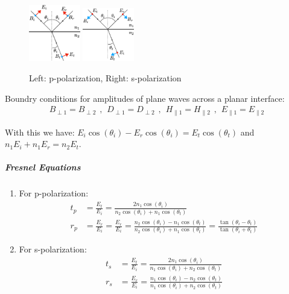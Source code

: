 \begin{figure}[h]
    \centering
    \includegraphics[width=0.2\textwidth]{Figures/p-polarization.png}
    \includegraphics[width=0.2\textwidth]{Figures/s-polarization.png}
    \caption{Left: p-polarization, Right: s-polarization}
\end{figure}

Boundry conditions for amplitudes of plane waves across a planar interface:
\begin{align*}
    B_{\perp 1} = B_{\perp 2}
    \hspace{5pt} , \hspace{5pt}
    D_{\perp 1} = D_{\perp 2}
    \hspace{5pt} , \hspace{5pt}
    H_{\parallel 1} = H_{\parallel 2}
    \hspace{5pt} , \hspace{5pt}
    E_{\parallel 1} = E_{\parallel 2}
\end{align*}

With this we have: $E_i \cos(\theta_i) - E_r \cos(\theta_i) = E_t \cos(\theta_t)$
and $n_1 E_i + n_1 E_r = n_2 E_t$.

\subparagraph{Fresnel Equations}
\begin{enumerate}[]
    \item For p-polarization:
        \begin{align*}
            t_p &= \frac{E_t}{E_i} = \frac{2 n_1 \cos(\theta_i)}{n_2 \cos(\theta_i) + n_1 \cos(\theta_t)}
            \\
            r_p &= \frac{E_r}{E_i} = \frac{E_r}{E_i} = \frac{n_2 \cos(\theta_i) - n_1 \cos(\theta_t)}{n_2 \cos(\theta_i) + n_1 \cos(\theta_t)}
                = \frac{\tan(\theta_i - \theta_t)}{\tan(\theta_i + \theta_t)}
        \end{align*}
    \item For s-polarization:
        \begin{align*}
            t_s &= \frac{E_t}{E_i} = \frac{2 n_1 \cos(\theta_i)}{n_1 \cos(\theta_i) + n_2 \cos(\theta_t)}
            \\
            r_s &= \frac{E_r}{E_i} = \frac{n_1 \cos(\theta_i) - n_2 \cos(\theta_t)}{n_1 \cos(\theta_i) + n_2 \cos(\theta_t)}
        \end{align*}
\end{enumerate}



